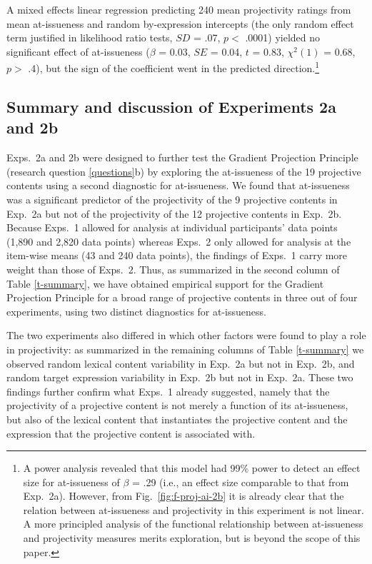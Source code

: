 \documentclass[11pt,fleqn]{article}
\newcommand{\6}{\mbox{$[\hspace*{-.6mm}[$}}
\newcommand{\9}{\mbox{$]\hspace*{-.6mm}]$}}
\newcommand{\figref}[1]{Fig.~\ref{#1}}
\begin{document}
A mixed effects linear regression predicting 240 mean projectivity ratings from mean at-issueness and random by-expression intercepts (the only random effect term justified in likelihood ratio tests, $SD$ = .07, $p <$ .0001) yielded no significant effect of at-issueness ($\beta$ = 0.03, $SE$ = 0.04, $t$ = 0.83, $\chi^2(1)$ = 0.68, $p >$ .4), but the sign of the coefficient went in the predicted direction.\footnote{A power analysis revealed that this model had 99\% power to detect an effect size for at-issueness of $\beta$ = .29 (i.e., an effect size comparable to that from Exp.~2a).  However, from \figref{fig:f-proj-ai-2b} it is already clear that the relation between at-issueness and projectivity in this experiment is not linear. A more principled analysis of the functional relationship between at-issueness and projectivity measures merits exploration, but is beyond the scope of this paper.   %
} 


\subsection{Summary and discussion of Experiments 2a and 2b}\label{s-disc2}

Exps.~2a and 2b were designed to further test the Gradient Projection Principle (research question \ref{questions}b) by exploring the at-issueness of the 19 projective contents using a second diagnostic for at-issueness. We found that at-issueness was a significant predictor of the projectivity of the 9 projective contents in Exp.~2a but not of the projectivity of the 12 projective contents in Exp.~2b. Because Exps.~1 allowed for analysis at individual participants' data points (1,890 and 2,820 data points) whereas Exps.~2 only allowed for analysis at the item-wise means (43 and 240 data points), the findings of Exps.~1 carry more weight than those of Exps.~2. Thus, as summarized in the second column of Table \ref{t-summary}, we have obtained empirical support for the Gradient Projection Principle for a broad range of projective contents in three out of four experiments, using two distinct diagnostics for at-issueness. 


The two experiments also differed in which other factors were found to play a role in projectivity: as summarized in the remaining columns of Table \ref{t-summary} we observed random lexical content variability in Exp.~2a but not in Exp.~2b, and random target expression variability in Exp.~2b but not in Exp.~2a. These two findings further confirm what Exps.~1 already suggested, namely that the projectivity of a projective content is not merely a function of its at-issueness, but also of the lexical content that instantiates the projective content and the expression that the projective content is associated with. 
\end{document}
